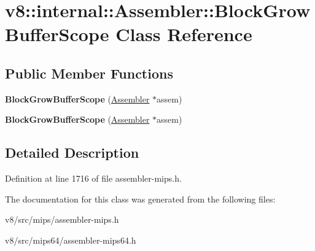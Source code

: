 \hypertarget{classv8_1_1internal_1_1Assembler_1_1BlockGrowBufferScope}{}\section{v8\+:\+:internal\+:\+:Assembler\+:\+:Block\+Grow\+Buffer\+Scope Class Reference}
\label{classv8_1_1internal_1_1Assembler_1_1BlockGrowBufferScope}
\subsection*{Public Member Functions}
\begin{DoxyCompactItemize}
\item 
\mbox{\label{classv8_1_1internal_1_1Assembler_1_1BlockGrowBufferScope_ab54b604bd347f5376c2c513ce648ec7e}} 
{\bfseries Block\+Grow\+Buffer\+Scope} (\mbox{\hyperlink{classv8_1_1internal_1_1Assembler}{Assembler}} $\ast$assem)
\item 
\mbox{\label{classv8_1_1internal_1_1Assembler_1_1BlockGrowBufferScope_ab54b604bd347f5376c2c513ce648ec7e}} 
{\bfseries Block\+Grow\+Buffer\+Scope} (\mbox{\hyperlink{classv8_1_1internal_1_1Assembler}{Assembler}} $\ast$assem)
\end{DoxyCompactItemize}


\subsection{Detailed Description}


Definition at line 1716 of file assembler-\/mips.\+h.



The documentation for this class was generated from the following files\+:\begin{DoxyCompactItemize}
\item 
v8/src/mips/assembler-\/mips.\+h\item 
v8/src/mips64/assembler-\/mips64.\+h\end{DoxyCompactItemize}
